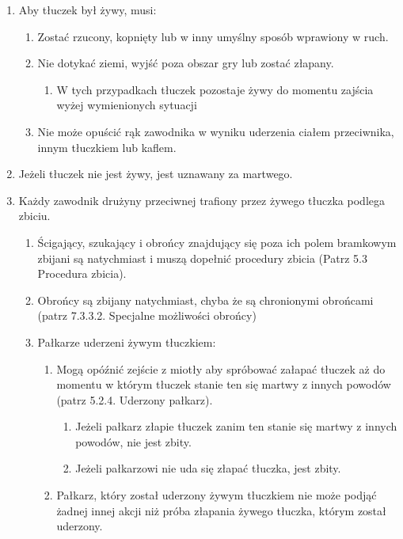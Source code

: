 \documentclass[12pt]{article}
\begin{document}
\begin{enumerate}
\item
  Aby tłuczek był żywy, musi:

  \begin{enumerate}
  \item
        Zostać rzucony, kopnięty lub w inny umyślny sposób wprawiony w ruch.
      \item
        Nie dotykać ziemi, wyjść poza obszar gry lub zostać złapany.
    
    \begin{enumerate}
    \item
            W tych przypadkach tłuczek pozostaje żywy do momentu zajścia wyżej
      wymienionych sytuacji
          \end{enumerate}
  \item
        Nie może opuścić rąk zawodnika w wyniku uderzenia ciałem
    przeciwnika, innym tłuczkiem lub kaflem.
      \end{enumerate}
\item
    Jeżeli tłuczek nie jest żywy, jest uznawany za martwego.
  \item
  Każdy zawodnik drużyny przeciwnej trafiony przez żywego tłuczka
  podlega zbiciu.

  \begin{enumerate}
  \item
        Ścigający, szukający i obrońcy znajdujący się poza ich polem
    bramkowym zbijani są natychmiast i muszą dopełnić procedury zbicia
    (Patrz 5.3 Procedura zbicia).
      \item
        Obrońcy są zbijany natychmiast, chyba że są chronionymi obrońcami
    (patrz 7.3.3.2. Specjalne możliwości obrońcy)
      \item
        Pałkarze uderzeni żywym tłuczkiem:
    
    \begin{enumerate}
    \item
            Mogą opóźnić zejście z miotły aby spróbować załapać tłuczek aż do
      momentu w którym tłuczek stanie ten się martwy z innych powodów
      (patrz 5.2.4. Uderzony pałkarz).
      
      \begin{enumerate}
      \item
                Jeżeli pałkarz złapie tłuczek zanim ten stanie się martwy z
        innych powodów, nie jest zbity.
              \item
                Jeżeli pałkarzowi nie uda się złapać tłuczka, jest zbity.
              \end{enumerate}
    \item
            Pałkarz, który został uderzony żywym tłuczkiem nie może podjąć
      żadnej innej akcji niż próba złapania żywego tłuczka, którym
      został uderzony.
          \end{enumerate}
  \end{enumerate}
\end{enumerate}
\end{document}
